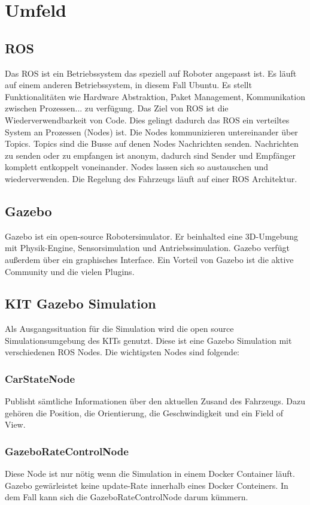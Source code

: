 \chapter{Umfeld}

\section{ROS}
Das \acf{ROS} ist ein Betriebssystem das speziell auf Roboter angepasst ist.
Es läuft auf einem anderen Betriebssystem, in diesem Fall Ubuntu.
Es stellt Funktionalitäten wie Hardware Abstraktion, Paket Management, Kommunikation zwischen Prozessen... zu verfügung.
Das Ziel von \acf{ROS} ist die Wiederverwendbarkeit von Code. 
Dies gelingt dadurch das \acf{ROS} ein verteiltes System an Prozessen (Nodes) ist. 
Die Nodes kommunizieren untereinander über Topics.
Topics sind die Busse auf denen Nodes Nachrichten senden.
Nachrichten zu senden oder zu empfangen ist anonym, dadurch sind Sender und Empfänger komplett entkoppelt voneinander.
\cite{rosTopics:2019}
Nodes lassen sich so austauschen und wiederverwenden.
\cite{rosIntro:2018}
Die Regelung des Fahrzeugs läuft auf einer ROS Architektur.


\section{Gazebo}
Gazebo ist ein open-source Robotersimulator.
Er beinhalted eine 3D-Umgebung mit Physik-Engine, Sensorsimulation und Antriebssimulation.
Gazebo verfügt außerdem über ein graphisches Interface.
Ein Vorteil von Gazebo ist die aktive Community und die vielen Plugins.
\cite{Gazebo}

\section{KIT Gazebo Simulation}
Als Ausgangssituation für die Simulation wird die open source Simulationsumgebung des KITs genutzt.
Diese ist eine Gazebo Simulation mit verschiedenen ROS Nodes.
Die wichtigsten Nodes sind folgende:
\subsection*{CarStateNode}
Publisht sämtliche Informationen über den aktuellen Zusand des Fahrzeugs. 
Dazu gehören die Position, die Orientierung, die Geschwindigkeit und ein Field of View.
\cite{KITcar:gazeboSimulationPackage}
\subsection*{GazeboRateControlNode}
Diese Node ist nur nötig wenn die Simulation in einem Docker Container läuft.
Gazebo gewärleistet keine update-Rate innerhalb eines Docker Conteiners.
In dem Fall kann sich die GazeboRateControlNode darum kümmern.
\cite{KITcar:gazeboSimulationPackage}

